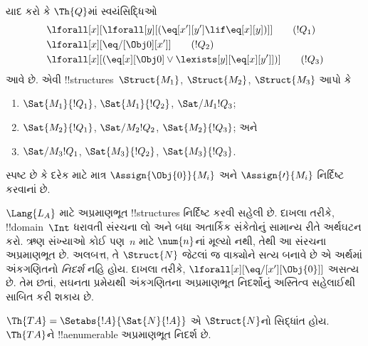 \documentclass[../../../include/open-logic-section]{subfiles}
\begin{document}
\begin{prob}
યાદ કરો કે $\Th{Q}$માં સ્વયંસિદ્ધિઓ
\begin{align*}
& \lforall[x][\lforall[y][(\eq[x'][y'] \lif \eq[x][y])]] \tag{$!Q_1$}\\
& \lforall[x][\eq/[\Obj 0][x']] \tag{$!Q_2$}\\
& \lforall[x][(\eq[x][\Obj 0] \lor \lexists[y][\eq[x][y']])] \tag{$!Q_3$}
\end{align*}
આવે છે. એવી !!{structure}s~$\Struct{M_1}$, $\Struct{M_2}$,
$\Struct{M_3}$ આપો કે
\begin{enumerate}
\item $\Sat{M_1}{!Q_1}$, $\Sat{M_1}{!Q_2}$, $\Sat/{M_1}{!Q_3}$;
\item $\Sat{M_2}{!Q_1}$, $\Sat/{M_2}{!Q_2}$, $\Sat{M_2}{!Q_3}$; અને
\item $\Sat/{M_3}{!Q_1}$, $\Sat{M_3}{!Q_2}$, $\Sat{M_3}{!Q_3}$.
\end{enumerate}
સ્પષ્ટ છે કે દરેક માટે માત્ર $\Assign{\Obj{0}}{M_i}$ અને
$\Assign{\prime}{M_i}$ નિર્દિષ્ટ કરવાનાં છે.
\end{prob}

\begin{explain}
$\Lang{L_A}$ માટે અપ્રમાણભૂત !!{structure}s નિર્દિષ્ટ કરવી સહેલી છે.
દાખલા તરીકે, !!{domain}~$\Int$ ધરાવતી સંરચના લો અને બધા અતાર્કિક
સંકેતોનું સામાન્ય રીતે અર્થઘટન કરો. ઋણ સંખ્યાઓ કોઈ પણ~$n$ માટે
$\num{n}$નાં મૂલ્યો નથી, તેથી આ સંરચના અપ્રમાણભૂત છે. અલબત્ત, તે
$\Struct{N}$ જેટલાં જ વાક્યોને સત્ય બનાવે છે એ અર્થમાં અંકગણિતનો
\emph{નિદર્શ} નહિ હોય. દાખલા તરીકે,
$\lforall[x][\eq/[x'][\Obj{0}]]$ અસત્ય છે. તેમ છતાં, સઘનતા પ્રમેયથી
અંકગણિતના અપ્રમાણભૂત નિદર્શોનું અસ્તિત્વ સહેલાઈથી સાબિત કરી શકાય છે.
\end{explain}

\begin{prop}
$\Th{TA}=\Setabs{!A}{\Sat{N}{!A}}$ એ $\Struct{N}$નો સિદ્ધાંત હોય.
$\Th{TA}$ને !!a{enumerable} અપ્રમાણભૂત નિદર્શ છે.
\end{prop}
\end{document}
